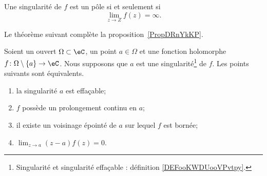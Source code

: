 \begin{proposition}
    Une singularité de \( f\) est un pôle si et seulement si
    \begin{equation}
        \lim_{z\to Z}f(z)=\infty.
    \end{equation}
\end{proposition}

Le théorème suivant complète la proposition~\ref{PropDRnYkKP}.
\begin{theorem}    \label{ThoTLQOEwW}
    Soient un ouvert \( \Omega\subset \eC\), un point \( a\in \Omega \) et une fonction holomorphe \( f\colon \Omega\setminus\{ a \}\to \eC\). Nous supposons que \( a\) est une singularité\footnote{Singularité et singularité effaçable : définition \ref{DEFooKWDUooVPvtpy}.} de \( f\). Les points suivants sont équivalents.
    \begin{enumerate}
        \item       \label{ITEMooMLXJooMfuifN}
            la singularité \( a\) est effaçable;
        \item       \label{ITEMooBWPEooEltHAa}
            \( f\) possède un prolongement continu en \( a\);
        \item       \label{ITEMooEAUOooIWcxHS}
            il existe un voisinage épointé de \( a\) sur lequel \( f\) est bornée;
        \item       \label{ITEMooETRWooDTTpxs}
            \( \lim_{z\to a}(z-a)f(z)=0\).
    \end{enumerate}
\end{theorem}

